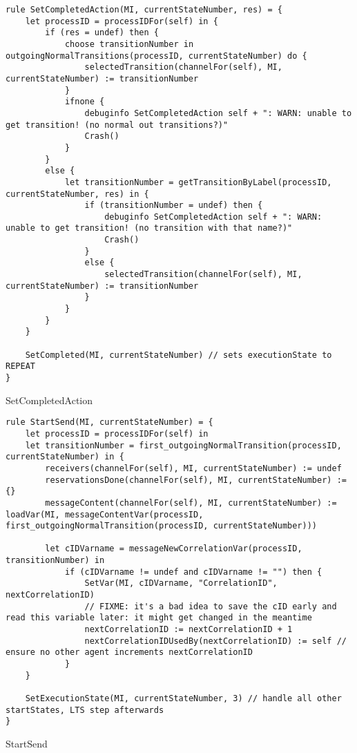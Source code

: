 \begin{listing}[H]
\begin{verbatim}
rule SetCompletedAction(MI, currentStateNumber, res) = {
    let processID = processIDFor(self) in {
        if (res = undef) then {
            choose transitionNumber in outgoingNormalTransitions(processID, currentStateNumber) do {
                selectedTransition(channelFor(self), MI, currentStateNumber) := transitionNumber
            }
            ifnone {
                debuginfo SetCompletedAction self + ": WARN: unable to get transition! (no normal out transitions?)"
                Crash()
            }
        }
        else {
            let transitionNumber = getTransitionByLabel(processID, currentStateNumber, res) in {
                if (transitionNumber = undef) then {
                    debuginfo SetCompletedAction self + ": WARN: unable to get transition! (no transition with that name?)"
                    Crash()
                }
                else {
                    selectedTransition(channelFor(self), MI, currentStateNumber) := transitionNumber
                }
            }
        }
    }

    SetCompleted(MI, currentStateNumber) // sets executionState to REPEAT
}
\end{verbatim}
\caption{SetCompletedAction}
\label{lst:asm:SetCompletedAction}
\end{listing}





\begin{listing}[H]
\begin{verbatim}
rule StartSend(MI, currentStateNumber) = {
    let processID = processIDFor(self) in
    let transitionNumber = first_outgoingNormalTransition(processID, currentStateNumber) in {
        receivers(channelFor(self), MI, currentStateNumber) := undef
        reservationsDone(channelFor(self), MI, currentStateNumber) := {}
        messageContent(channelFor(self), MI, currentStateNumber) := loadVar(MI, messageContentVar(processID, first_outgoingNormalTransition(processID, currentStateNumber)))

        let cIDVarname = messageNewCorrelationVar(processID, transitionNumber) in
            if (cIDVarname != undef and cIDVarname != "") then {
                SetVar(MI, cIDVarname, "CorrelationID", nextCorrelationID)
                // FIXME: it's a bad idea to save the cID early and read this variable later: it might get changed in the meantime
                nextCorrelationID := nextCorrelationID + 1
                nextCorrelationIDUsedBy(nextCorrelationID) := self // ensure no other agent increments nextCorrelationID
            }
    }

    SetExecutionState(MI, currentStateNumber, 3) // handle all other startStates, LTS step afterwards
}
\end{verbatim}
\caption{StartSend}
\label{lst:asm:StartSend}
\end{listing}




